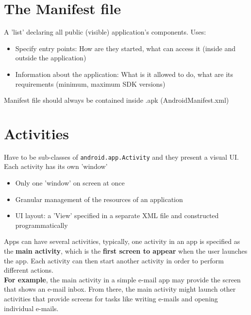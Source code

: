 \documentclass{article}
\begin{document}
\tableofcontents

\newpage

\section{The Manifest file}

A	'list' declaring all public (visible) application’s	components. Uses:
\begin{itemize}
  \item Specify	entry	points: How	are	they started, what can access it (inside and outside the application)
  \item Information about the application: What is it allowed to do, what are its requirements (minimum, maximum SDK versions)
\end{itemize}
Manifest file should always be contained inside .apk (AndroidManifest.xml)

\section{Activities}

Have to be sub-classes of \texttt{android.app.Activity} and they present a visual UI.\\
Each activity has its own 'window'
\begin{itemize}
  \item Only one 'window' on screen at once
  \item Granular management of the resources of an application
  \item UI layout: a 'View' specified in a separate XML file and constructed programmatically
\end{itemize}
Apps can have several activities, typically, one activity in an app is specified as the \textbf{main activity}, which is the \textbf{first screen to appear} when the user launches the app. Each activity can then start another activity in order to perform different actions. \\
\textbf{For example}, the main activity in a simple e-mail app may provide the screen that shows an e-mail inbox. From there, the main activity might launch other activities that provide screens for tasks like writing e-mails and opening individual e-mails.
\end{document}

